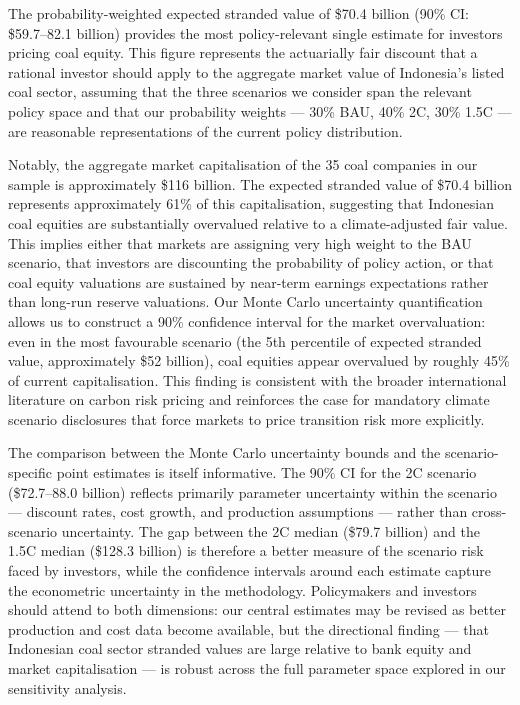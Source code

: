 The probability-weighted expected stranded value of \$70.4 billion (90\% CI: \$59.7--82.1 billion) provides the most policy-relevant single estimate for investors pricing coal equity. This figure represents the actuarially fair discount that a rational investor should apply to the aggregate market value of Indonesia's listed coal sector, assuming that the three scenarios we consider span the relevant policy space and that our probability weights --- 30\% BAU, 40\% 2\textdegree C, 30\% 1.5\textdegree C --- are reasonable representations of the current policy distribution.

Notably, the aggregate market capitalisation of the 35 coal companies in our sample is approximately \$116 billion. The expected stranded value of \$70.4 billion represents approximately 61\% of this capitalisation, suggesting that Indonesian coal equities are substantially overvalued relative to a climate-adjusted fair value. This implies either that markets are assigning very high weight to the BAU scenario, that investors are discounting the probability of policy action, or that coal equity valuations are sustained by near-term earnings expectations rather than long-run reserve valuations. Our Monte Carlo uncertainty quantification allows us to construct a 90\% confidence interval for the market overvaluation: even in the most favourable scenario (the 5th percentile of expected stranded value, approximately \$52 billion), coal equities appear overvalued by roughly 45\% of current capitalisation. This finding is consistent with the broader international literature on carbon risk pricing \citep{BoltonKacperczyk2021} and reinforces the case for mandatory climate scenario disclosures that force markets to price transition risk more explicitly.

The comparison between the Monte Carlo uncertainty bounds and the scenario-specific point estimates is itself informative. The 90\% CI for the 2\textdegree C scenario (\$72.7--88.0 billion) reflects primarily parameter uncertainty within the scenario --- discount rates, cost growth, and production assumptions --- rather than cross-scenario uncertainty. The gap between the 2\textdegree C median (\$79.7 billion) and the 1.5\textdegree C median (\$128.3 billion) is therefore a better measure of the scenario risk faced by investors, while the confidence intervals around each estimate capture the econometric uncertainty in the methodology. Policymakers and investors should attend to both dimensions: our central estimates may be revised as better production and cost data become available, but the directional finding --- that Indonesian coal sector stranded values are large relative to bank equity and market capitalisation --- is robust across the full parameter space explored in our sensitivity analysis.



